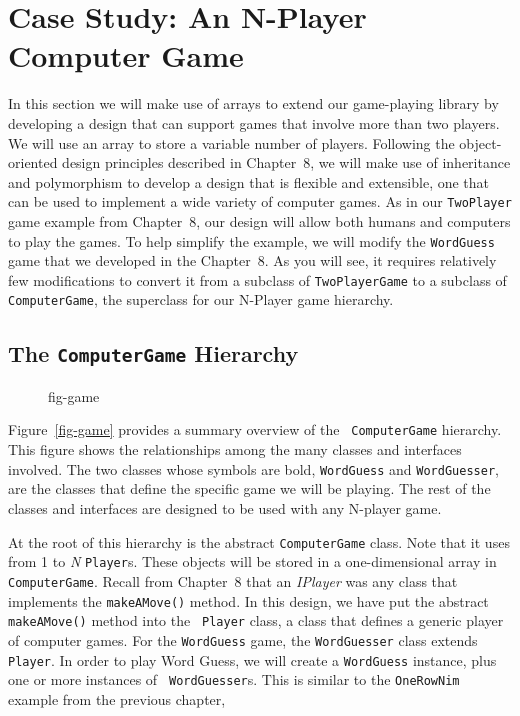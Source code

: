 \section{Case Study: An N-Player Computer Game}
\label{case-study-an-n-player-computer-game}

\noindent In this section we will make use of arrays to extend our
game-playing library by developing a design that can support games
that involve more than two players. We will use an array to store a
variable number of players. Following the object-oriented design
principles described in Chapter~8, we will make use of inheritance and
polymorphism to develop a design that is flexible and extensible, 
one that can be used to implement a wide variety of computer games.
As in our {\tt TwoPlayer} game example from Chapter~8, our design will
allow both humans and computers to play the games.  To help simplify
the example, we will modify the {\tt WordGuess} game that we developed
in the Chapter~8. As you will see, it requires relatively few
modifications to convert it from a subclass of {\tt TwoPlayerGame} to
a subclass of {\tt ComputerGame}, the superclass for our N-Player game
hierarchy.

\subsection{The {\tt ComputerGame} Hierarchy}

\begin{figure}[bt]
 {fig-game}

\end{figure}

Figure~\ref{fig-game} provides a summary overview of the {\tt
ComputerGame} hierarchy.  This figure shows the relationships
among the many classes and interfaces involved.  The two classes whose
symbols are bold, {\tt WordGuess} and {\tt WordGuesser}, are the
classes that define the specific game we will be playing.  The
rest of the classes and interfaces are designed to be used with
any N-player game. 

At the root of this hierarchy is the abstract {\tt ComputerGame}
class.  Note that it uses from 1 to {\em N} {\tt Player}s. These
objects will be stored in a one-dimensional array in {\tt
ComputerGame}.  Recall from Chapter~8 that an {\em IPlayer} was any
class that implements the {\tt makeAMove()} method.  In this design,
we have put the abstract {\tt makeAMove()} method into the {\tt
Player} class, a class that defines a generic player of computer
games.  For the {\tt WordGuess} game, the {\tt WordGuesser} class
extends {\tt Player}.  In order to play Word Guess, we will create a
{\tt WordGuess} instance, plus one or more instances of {\tt
WordGuesser}s. This is similar to the {\tt OneRowNim} example from the
previous chapter,

